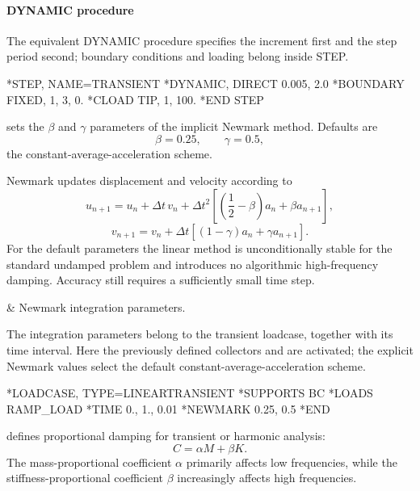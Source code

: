 \paragraph*{DYNAMIC procedure}

The equivalent DYNAMIC procedure specifies the increment first and the step period second; boundary conditions and loading belong inside STEP.
\begin{inputdeck}
*STEP, NAME=TRANSIENT
*DYNAMIC, DIRECT
0.005, 2.0
*BOUNDARY
FIXED, 1, 3, 0.
*CLOAD
TIP, 1, 100.
*END STEP
\end{inputdeck}


 sets the \(\beta\) and \(\gamma\) parameters of the implicit Newmark method. Defaults are
\[
\beta=0.25,\qquad\gamma=0.5,
\]
the constant-average-acceleration scheme.

Newmark updates displacement and velocity according to
\[
u_{n+1}
=u_n+\Delta t\,v_n
+\Delta t^2\left[\left(\frac12-\beta\right)a_n+\beta a_{n+1}\right],
\]
\[
v_{n+1}
=v_n+\Delta t\left[(1-\gamma)a_n+\gamma a_{n+1}\right].
\]
For the default parameters the linear method is unconditionally stable for the standard undamped problem and introduces no algorithmic high-frequency damping. Accuracy still requires a sufficiently small time step.

\begin{keyworddata}
 & Newmark integration parameters. \\
\end{keyworddata}

The integration parameters belong to the transient loadcase, together
with its time interval. Here the previously defined collectors
 and  are activated; the explicit Newmark
values select the default constant-average-acceleration scheme.

\exampleheading
\begin{inputdeck}
*LOADCASE, TYPE=LINEARTRANSIENT
*SUPPORTS
BC
*LOADS
RAMP_LOAD
*TIME
0., 1., 0.01
*NEWMARK
0.25, 0.5
*END
\end{inputdeck}


 defines proportional damping for transient or harmonic analysis:
\[
C=\alpha M+\beta K.
\]
The mass-proportional coefficient \(\alpha\) primarily affects low frequencies, while the stiffness-proportional coefficient \(\beta\) increasingly affects high frequencies.

